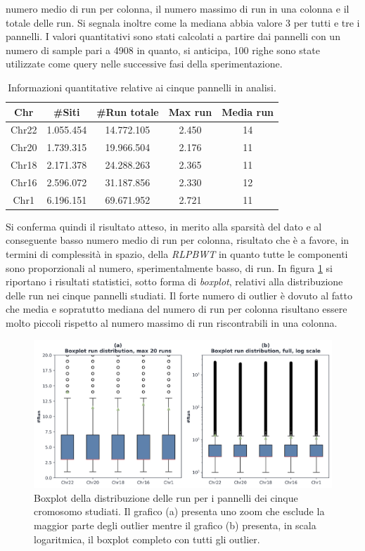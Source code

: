 numero medio di run per colonna, il numero 
massimo di run in una colonna e il totale delle run. Si segnala inoltre come la
mediana abbia valore 3 per tutti e tre i pannelli. I valori quantitativi sono
stati calcolati a partire dai pannelli con un numero di sample pari a 4908 in
quanto, si anticipa, 100 righe sono state utilizzate come query nelle successive
fasi della sperimentazione.
\begin{table}
  \centering
  \caption{Informazioni quantitative relative ai cinque pannelli in analisi.}
  \label{tab:panel}
  \begin{tabular}{c||c|c|c|c}
    \textbf{Chr} & \textbf{\#Siti} & \textbf{\#Run totale}
    & \textbf{Max run} & \textbf{Media run} \\ 
    \hline
    Chr22 & 1.055.454 & 14.772.105 & 2.450 & 14\\
    Chr20 & 1.739.315 & 19.966.504 & 2.176 & 11\\
    Chr18 & 2.171.378 & 24.288.263 & 2.365 & 11\\
    Chr16 & 2.596.072 & 31.187.856 & 2.330 & 12\\
    Chr1 & 6.196.151 & 69.671.952 & 2.721 & 11\\
  \end{tabular}
\end{table}
Si conferma quindi il risultato atteso, in merito alla sparsità del dato e al
conseguente basso numero medio di run per colonna, risultato che è a favore, in
termini di 
complessità in spazio, della \textit{RLPBWT} in quanto tutte le componenti sono
proporzionali al numero, sperimentalmente basso, di run. In figura
\ref{fig:boxplot} si riportano i risultati statistici, sotto forma di
\textit{boxplot}, relativi alla distribuzione delle run nei cinque pannelli
studiati. Il forte numero di outlier è dovuto al fatto che media e sopratutto
mediana del numero di run per colonna risultano essere molto piccoli rispetto al
numero massimo di run riscontrabili in una colonna.
\begin{figure}
  \centering
  \includegraphics[width = \linewidth]{img/boxplotbi.png}
  \caption{Boxplot della distribuzione delle run per i pannelli dei cinque
    cromosomo studiati. Il grafico (a) presenta uno zoom che esclude la maggior
    parte degli outlier mentre il grafico (b) presenta, in scala logaritmica, il
    boxplot completo con tutti gli outlier.}
  \label{fig:boxplot}
\end{figure}

